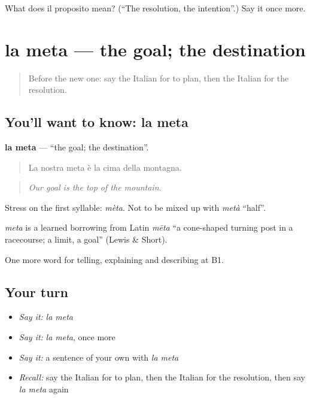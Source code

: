 \begin{tcolorbox}[breakable,colback=teal!4,colframe=teal!35!black,title={Before you move on}]
What does il proposito mean? (\textquotedblleft{}The resolution, the intention\textquotedblright{}.) Say it once more.
\end{tcolorbox}
\section[la meta]{la meta — the goal; the destination}

\label{lesson:IT-C378-meta}



\begin{quote}
Before the new one: say the Italian for to plan, then the Italian for the resolution.
\end{quote}

\subsection*{You'll want to know: la meta}
\textbf{la meta} — \textquotedblleft{}the goal; the destination\textquotedblright{}.

\begin{quote}
La nostra meta è la cima della montagna.
\end{quote}

\begin{quote}
\emph{Our goal is the top of the mountain.}
\end{quote}

Stress on the first syllable: \emph{mèta}. Not to be mixed up with \emph{metà} \textquotedblleft{}half\textquotedblright{}.

\begin{cousinweb}
\emph{meta} is a learned borrowing from Latin \emph{mēta} \textquotedblleft{}a cone-shaped turning post in a racecourse; a limit, a goal\textquotedblright{} (Lewis \& Short).
\end{cousinweb}

\begin{grammarlens}[title={What you've built}]
One more word for telling, explaining and describing at B1.
\end{grammarlens}

\subsection*{Your turn}
\begin{itemize}
\raggedright
  \item \emph{Say it:} \emph{la meta}
  \item \emph{Say it:} \emph{la meta}, once more
  \item \emph{Say it:} a sentence of your own with \emph{la meta}
  \item \emph{Recall:} say the Italian for to plan, then the Italian for the resolution, then say \emph{la meta} again
\end{itemize}

